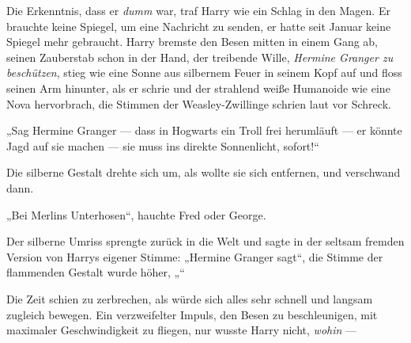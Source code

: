 Die Erkenntnis, dass er \emph{dumm} war, traf Harry wie ein Schlag in den Magen. Er brauchte keine Spiegel, um eine Nachricht zu senden, er hatte seit Januar keine Spiegel mehr gebraucht. Harry bremste den Besen mitten in einem Gang ab, seinen Zauberstab schon in der Hand, der treibende Wille, \emph{Hermine Granger zu beschützen}, stieg wie eine Sonne aus silbernem Feuer in seinem Kopf auf und floss seinen Arm hinunter, als er  schrie und der strahlend weiße Humanoide wie eine Nova hervorbrach, die Stimmen der Weasley-Zwillinge schrien laut vor Schreck.

„Sag Hermine Granger — dass in Hogwarts ein Troll frei herumläuft — er könnte Jagd auf sie machen — sie muss ins direkte Sonnenlicht, sofort!“

Die silberne Gestalt drehte sich um, als wollte sie sich entfernen, und verschwand dann.

„Bei Merlins Unterhosen“, hauchte Fred oder George.

Der silberne Umriss sprengte zurück in die Welt und sagte in der seltsam fremden Version von Harrys eigener Stimme:
„Hermine Granger sagt“, die Stimme der flammenden Gestalt wurde höher,
„“

Die Zeit schien zu zerbrechen, als würde sich alles sehr schnell und langsam zugleich bewegen. Ein verzweifelter Impuls, den Besen zu beschleunigen, mit maximaler Geschwindigkeit zu fliegen, nur wusste Harry nicht, \emph{wohin} —

